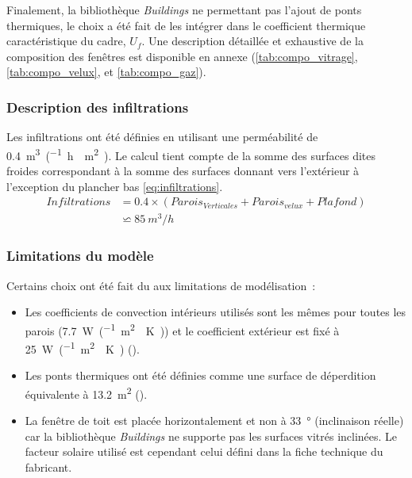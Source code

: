 Finalement, la bibliothèque \emph{Buildings} ne permettant pas l’ajout de ponts
thermiques, le choix a été fait de les intégrer dans le coefficient thermique
caractéristique du cadre, $U_{f}$. Une description détaillée et exhaustive de la
composition des fenêtres est disponible en annexe (\autoref{tab:compo_vitrage},
\autoref{tab:compo_velux}, et \autoref{tab:compo_gaz}).


\subsubsection{Description des infiltrations} %
\label{ssub:description_des_infiltrations}
Les infiltrations ont été définies en utilisant une perméabilité de
\SI{0.4}{m^{3}\per(\hour\period\meter\squared)}. Le calcul tient compte de la
somme des surfaces dites froides correspondant à la somme des surfaces donnant
vers l’extérieur à l’exception du plancher bas \eqref{eq:infiltrations}.
\begin{equation}
    \begin{aligned}
    Infiltrations &= \num{0.4} \times (Parois_{Verticales} + Parois_{velux} + Plafond)\\
    &              \backsimeq \SI{85}{m^{3}/h}
    \label{eq:infiltrations}
    \end{aligned}
\end{equation}



\subsubsection{Limitations du modèle} %
\label{ssub:limitations_du_modele}
Certains choix ont été fait du aux limitations de modélisation~:
\begin{itemize}
    \item Les coefficients de convection intérieurs utilisés sont les mêmes pour toutes
          les parois (\SI{7.7}{\watt\per(\meter\squared\period\kelvin)}) et le coefficient extérieur
          est fixé à \SI{25}{\watt\per(\meter\squared\period\kelvin)} (\textcite{NFENISO6946}).
    \item Les ponts thermiques ont été définies comme une surface de déperdition
          équivalente à \SI{13.2}{\meter\squared} ().
    \item La fenêtre de toit est placée horizontalement et non à \SI{33}{\degree}
          (inclinaison réelle) car la bibliothèque \emph{Buildings} ne supporte pas les
          surfaces vitrés inclinées. Le facteur solaire utilisé est cependant celui défini
          dans la fiche technique du fabricant.
\end{itemize}


